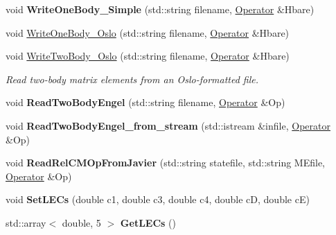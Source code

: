 \begin{DoxyCompactItemize}
\item 
\hypertarget{classReadWrite_a4dc42f9903602068c7d733d872f845d4}{void {\bfseries Write\-One\-Body\-\_\-\-Simple} (std\-::string filename, \hyperlink{classOperator}{Operator} \&Hbare)}\label{classReadWrite_a4dc42f9903602068c7d733d872f845d4}

\item 
void \hyperlink{classReadWrite_a9f2554cdd414e39fb19a49edff3d0b23}{Write\-One\-Body\-\_\-\-Oslo} (std\-::string filename, \hyperlink{classOperator}{Operator} \&Hbare)
\item 
\hypertarget{classReadWrite_a36661c43d1863c8c1df2add2a90eb62c}{void \hyperlink{classReadWrite_a36661c43d1863c8c1df2add2a90eb62c}{Write\-Two\-Body\-\_\-\-Oslo} (std\-::string filename, \hyperlink{classOperator}{Operator} \&Hbare)}\label{classReadWrite_a36661c43d1863c8c1df2add2a90eb62c}

\begin{DoxyCompactList}\small\item\em Read two-\/body matrix elements from an Oslo-\/formatted file. \end{DoxyCompactList}\item 
\hypertarget{classReadWrite_a7b187a8f3c2091cdaeb8a16a51fbab71}{void {\bfseries Read\-Two\-Body\-Engel} (std\-::string filename, \hyperlink{classOperator}{Operator} \&Op)}\label{classReadWrite_a7b187a8f3c2091cdaeb8a16a51fbab71}

\item 
\hypertarget{classReadWrite_ac91541e7320f890e949c35583d1dac35}{void {\bfseries Read\-Two\-Body\-Engel\-\_\-from\-\_\-stream} (std\-::istream \&infile, \hyperlink{classOperator}{Operator} \&Op)}\label{classReadWrite_ac91541e7320f890e949c35583d1dac35}

\item 
\hypertarget{classReadWrite_abcbfc21e41437a65fdb5612f47a37d9a}{void {\bfseries Read\-Rel\-C\-M\-Op\-From\-Javier} (std\-::string statefile, std\-::string M\-Efile, \hyperlink{classOperator}{Operator} \&Op)}\label{classReadWrite_abcbfc21e41437a65fdb5612f47a37d9a}

\item 
\hypertarget{classReadWrite_a10180e94275661120691d68111df58ad}{void {\bfseries Set\-L\-E\-Cs} (double c1, double c3, double c4, double c\-D, double c\-E)}\label{classReadWrite_a10180e94275661120691d68111df58ad}

\item 
\hypertarget{classReadWrite_a6ab1509f492feb9298ee1e686f0418c3}{std\-::array$<$ double, 5 $>$ {\bfseries Get\-L\-E\-Cs} ()}\label{classReadWrite_a6ab1509f492feb9298ee1e686f0418c3}


\end{DoxyCompactItemize}
